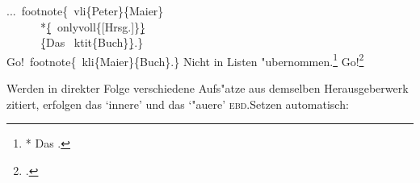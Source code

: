 \documentclass[12pt,a4paper]{article}
\newcommand{\pbs}{\string\ \unskip}
\newcommand{\bs}{\protect\pbs}
\begin{document}
\vspace{-.25ex}
\Doppelbox
{
\vspace{-.3ex}
...\bs footnote\{\bs vli\{Peter\}\{Maier\} 
\\[.4ex] \ \ \ \ \ \ *\b{\b{\{}}\bs onlyvoll\{[Hrsg.]\}\b{\b{\}}} 
\\[.3ex] \ \ \ \ \ \ \b{\{}Das \bs ktit\{Buch\}\b{\}}.\} 
\\[.7ex] Go!\bs footnote\{\bs kli\{Maier\}\{Buch\}.\} 
}
{Nicht in Listen "ubernommen.\footnote{\notktitaddtok
{} *{\onlyvoll{[Hrsg.]}} {Das }.}
Go!\footnote{.}
}


\vfill\noindent
Werden in direkter Folge verschiedene Aufs"atze aus demselben 
Herausgeberwerk zitiert, erfolgen das `innere' und das `"au\hyss ere'
\textsc{ebd.}\hy Setzen automatisch:
\end{document}
